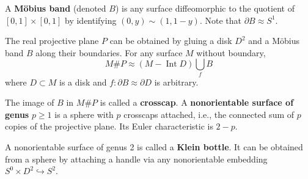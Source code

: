 A \textbf{Möbius band} (denoted $B$) is any surface diffeomorphic to the quotient of $[0,1] \times [0,1]$ by identifying $(0, y) \sim (1, 1-y)$. Note that $\partial B \approx S^1$.

The real projective plane $P$ can be obtained by gluing a disk $D^2$ and a Möbius band $B$ along their boundaries. For any surface $M$ without boundary,
$$
M \# P \approx (M - \operatorname{Int} D) \bigcup_f B
$$
where $D \subset M$ is a disk and $f: \partial B \approx \partial D$ is arbitrary.

The image of $B$ in $M \# P$ is called a \textbf{crosscap}. A \textbf{nonorientable surface of genus} $p \geqslant 1$ is a sphere with $p$ crosscaps attached, i.e., the connected sum of $p$ copies of the projective plane. Its Euler characteristic is $2 - p$.

A nonorientable surface of genus 2 is called a \textbf{Klein bottle}. It can be obtained from a sphere by attaching a handle via any nonorientable embedding $S^0 \times D^2 \hookrightarrow S^2$.
